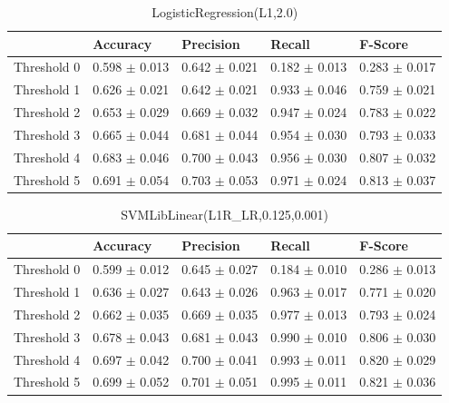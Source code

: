 \begin{table}[h]
	\centering
	\begin{tabular}{|l|l|l|l|l|} %
	\hline
	& Accuracy & Precision & Recall & F-Score \\ \hline
	Threshold 0 & 0.598	\( \pm \) 0.013	& 0.642	\( \pm \) 0.021	& 0.182	\( \pm \) 0.013	& 0.283	\( \pm \) 0.017	\\ \hline
	Threshold 1 & 0.626	\( \pm \) 0.021	& 0.642	\( \pm \) 0.021	& 0.933	\( \pm \) 0.046	& 0.759	\( \pm \) 0.021	\\ \hline
	Threshold 2 & 0.653	\( \pm \) 0.029	& 0.669	\( \pm \) 0.032	& 0.947	\( \pm \) 0.024	& 0.783	\( \pm \) 0.022	\\ \hline
	Threshold 3 & 0.665	\( \pm \) 0.044	& 0.681	\( \pm \) 0.044	& 0.954	\( \pm \) 0.030	& 0.793	\( \pm \) 0.033	\\ \hline
	Threshold 4 & 0.683	\( \pm \) 0.046	& 0.700	\( \pm \) 0.043	& 0.956	\( \pm \) 0.030	& 0.807	\( \pm \) 0.032	\\ \hline
	Threshold 5 & 0.691	\( \pm \) 0.054	& 0.703	\( \pm \) 0.053	& 0.971	\( \pm \) 0.024	& 0.813	\( \pm \) 0.037	\\ \hline
	\end{tabular}
	\caption{LogisticRegression(L1,2.0)}
	\label{tab:revpol}
\end{table}
\clearpage
\begin{table}[h]
	\centering
	\begin{tabular}{|l|l|l|l|l|} %
	\hline
	& Accuracy & Precision & Recall & F-Score \\ \hline
	Threshold 0 & 0.599	\( \pm \) 0.012	& 0.645	\( \pm \) 0.027	& 0.184	\( \pm \) 0.010	& 0.286	\( \pm \) 0.013	\\ \hline
	Threshold 1 & 0.636	\( \pm \) 0.027	& 0.643	\( \pm \) 0.026	& 0.963	\( \pm \) 0.017	& 0.771	\( \pm \) 0.020	\\ \hline
	Threshold 2 & 0.662	\( \pm \) 0.035	& 0.669	\( \pm \) 0.035	& 0.977	\( \pm \) 0.013	& 0.793	\( \pm \) 0.024	\\ \hline
	Threshold 3 & 0.678	\( \pm \) 0.043	& 0.681	\( \pm \) 0.043	& 0.990	\( \pm \) 0.010	& 0.806	\( \pm \) 0.030	\\ \hline
	Threshold 4 & 0.697	\( \pm \) 0.042	& 0.700	\( \pm \) 0.041	& 0.993	\( \pm \) 0.011	& 0.820	\( \pm \) 0.029	\\ \hline
	Threshold 5 & 0.699	\( \pm \) 0.052	& 0.701	\( \pm \) 0.051	& 0.995	\( \pm \) 0.011	& 0.821	\( \pm \) 0.036	\\ \hline
	\end{tabular}
	\caption{SVMLibLinear(L1R\_LR,0.125,0.001)}
	\label{tab:revpol}
\end{table}
